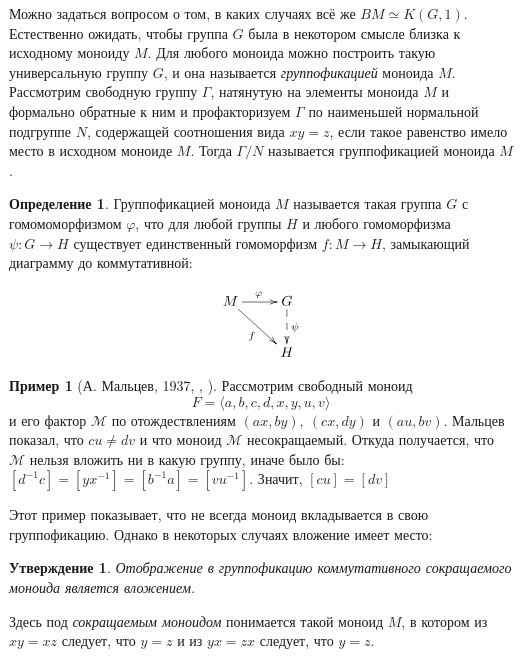 \documentclass[14pt, dvipsnames]{extarticle}
\newtheorem{statement}{Утверждение}
\theoremstyle{definition}
\newtheorem{defi}{Определение}
\newtheorem{example}{Пример}
\theoremstyle{remark}
\begin{document}
Можно задаться вопросом о том, в каких случаях всё же $BM\simeq K(G, 1)$. Естественно ожидать, чтобы группа $G$ была в некотором смысле близка к исходному моноиду $M$. Для любого моноида можно построить такую универсальную группу $G$, и она называется {\it группофикацией} моноида $M$. Рассмотрим свободную группу $\Gamma$, натянутую на элементы моноида $M$ и формально обратные к ним и профакторизуем $\Gamma$ по наименьшей нормальной подгруппе $N$, содержащей соотношения вида $xy=z$, если такое равенство имело место в исходном моноиде $M$. Тогда $\Gamma/N$ называется группофикацией моноида $M$.

\begin{defi}

Группофикацией моноида $M$ называется такая группа $G$ с гомомоморфизмом $\varphi$, что для любой группы $H$ и любого гомоморфизма $\psi: G\to H$ существует единственный гомоморфизм $f:M\to H$, замыкающий диаграмму до коммутативной: 

$$
\xymatrix{
    M  \ar[dr]_f \ar[r]^\varphi & G \ar@{-->}[d]^\psi \\
                         & H }
$$

\end{defi}

 



\begin{example}[А. Мальцев, 1937, \cite{Malcev}, \cite{Lenz}]

Рассмотрим свободный моноид $$F=\langle a, b, c, d, x, y, u, v \rangle$$ и его фактор $\mathcal{M}$ по отождествлениям $(ax, by),\ (cx, dy)$ и $(au, bv)$. Мальцев показал, что $cu\neq dv$ и что моноид $\mathcal{M}$ несокращаемый. Откуда получается, что $\mathcal{M}$ нельзя вложить ни в какую группу, иначе было бы: $[d^{-1}c]=[yx^{-1}]=[b^{-1}a]=[vu^{-1}]$. Значит, $[cu]=[dv]$ 

\end{example} 



Этот пример показывает, что не всегда моноид вкладывается в свою группофикацию. Однако в некоторых случаях вложение имеет место:

\begin{statement}
Отображение в группофикацию коммутативного сокращаемого моноида является вложением.
\end{statement}

Здесь под {\it сокращаемым моноидом} понимается такой моноид $M$, в котором из $xy=xz$ следует, что $y=z$ и из $yx=zx$ следует, что $y=z$.
\end{document}
